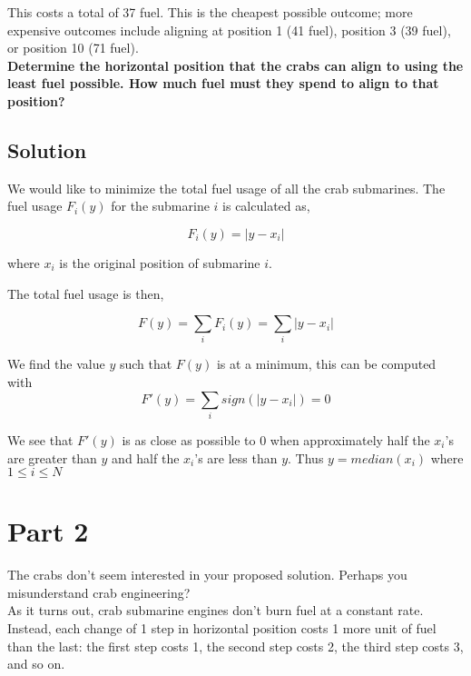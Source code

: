 \documentclass{article}
\begin{document}
This costs a total of 37 fuel. This is the cheapest possible outcome; more
expensive outcomes include aligning at position 1 (41 fuel), position 3 (39
fuel), or position 10 (71 fuel).\\

\textbf{Determine the horizontal position that the crabs can align to using the
    least fuel possible. How much fuel must they spend to align to that
    position?}\\

\subsection{Solution}
We would like to minimize the total fuel usage of all the crab submarines. The
fuel usage \(F_i(y)\) for the submarine \(i\) is calculated as,

\begin{equation}
    F_i(y) = |y - x_i|
\end{equation}

where \(x_i\) is the original position of submarine \(i\).

The total fuel usage is then,

\begin{equation}
    F(y) = \sum_{i} F_i(y) = \sum_{i} |y - x_i|
\end{equation}

We find the value \(y\) such that \(F(y)\) is at a minimum, this can be computed
with
\begin{equation}
    F'(y) = \sum_{i} sign(|y - x_i|) = 0
\end{equation}

We see that \(F'(y)\) is as close as possible to \(0\) when approximately half
the \(x_i\)'s are greater than \(y\) and half the \(x_i\)'s are less than \(y\).
Thus \(y = median(x_i)\) where \(1 \leq i \leq N\)\\

\section{Part 2}

The crabs don't seem interested in your proposed solution. Perhaps you
misunderstand crab engineering?\\


As it turns out, crab submarine engines don't burn fuel at a constant rate.
Instead, each change of 1 step in horizontal position costs 1 more unit of fuel
than the last: the first step costs 1, the second step costs 2, the third step
costs 3, and so on.\\
\end{document}
